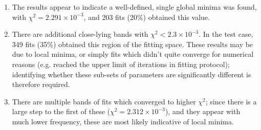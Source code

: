 \begin{enumerate}
\item The results appear to indicate a well-defined, single global minima was found, with $\chi^2 = 2.291\times10^{-3}$, and 203 fits (20\%) obtained this value.
\item There are additional close-lying bands with $\chi^2 < 2.3\times10^{-3}$. In the test case, 349 fits (35\%) obtained this region of the fitting space. These results may be due to local minima, or simply fits which didn't quite converge for numerical reasons (e.g. reached the upper limit of iterations in fitting protocol); identifying whether these sub-sets of parameters are significantly different is therefore required.
\item There are multiple bands of fits which converged to higher $\chi^2$; since there is a large step to the first of these ($\chi^2 = 2.312\times10^{-3}$), and they appear with much lower frequency, these are most likely indicative of local minima.

\end{enumerate}


